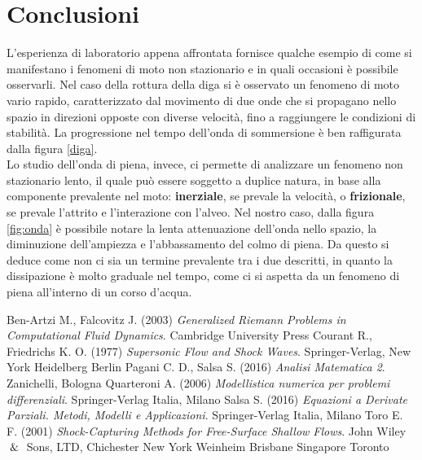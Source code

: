 \documentclass[12pt]{article} %
\begin{document}
\newpage

\section{Conclusioni}
\noindent L'esperienza di laboratorio appena affrontata fornisce qualche esempio di come si manifestano i fenomeni di moto non stazionario e in quali occasioni è possibile osservarli.
Nel caso della rottura della diga si è osservato un fenomeno di moto vario rapido, caratterizzato dal movimento di due onde che si propagano nello spazio in direzioni opposte con diverse velocità, fino a raggiungere le condizioni di stabilità. La progressione nel tempo dell'onda di sommersione è ben raffigurata dalla figura \ref{diga}.\\
Lo studio dell'onda di piena, invece, ci permette di analizzare un fenomeno non stazionario lento, il quale può essere soggetto a duplice natura, in base alla componente prevalente nel moto: \textbf{inerziale}, se prevale la velocità, o \textbf{frizionale}, se prevale l'attrito e l'interazione con l'alveo. Nel nostro caso, dalla figura \ref{fig:onda} è possibile notare la lenta attenuazione dell'onda nello spazio, la diminuzione dell'ampiezza e l'abbassamento del colmo di piena. Da questo si deduce come non ci sia un termine prevalente tra i due descritti, in quanto la dissipazione è molto graduale nel tempo, come ci si aspetta da un fenomeno di piena all'interno di un corso d'acqua.





\newpage
\begin{thebibliography}{}
Ben-Artzi M., Falcovitz J. (2003) \textit{Generalized Riemann Problems in Computational Fluid Dynamics}. Cambridge University Press
Courant R., Friedrichs K. O. (1977) \textit{Supersonic Flow and Shock Waves}. Springer-Verlag, New York Heidelberg Berlin
Pagani C. D., Salsa S. (2016) \textit{Analisi Matematica 2}. Zanichelli, Bologna
Quarteroni A. (2006) \textit{Modellistica numerica per problemi differenziali}. Springer-Verlag Italia, Milano
Salsa S. (2016) \textit{Equazioni a Derivate Parziali. Metodi, Modelli e Applicazioni}. Springer-Verlag Italia, Milano
Toro E. F. (2001) \textit{Shock-Capturing Methods for Free-Surface Shallow Flows}. John Wiley $\And$ Sons, LTD, Chichester New York Weinheim Brisbane Singapore Toronto 
\end{thebibliography}
\end{document}
